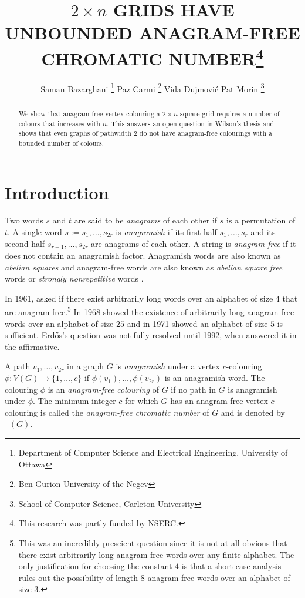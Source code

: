 \documentclass{patmorin}
\title{\MakeUppercase{$2\times n$ Grids have Unbounded Anagram-Free Chromatic Number}\thanks{This research was partly funded by NSERC.}}
\author{Saman Bazarghani%
    \thanks{Department of Computer Science and Electrical Engineering, University of Ottawa}\qquad
    Paz Carmi%
    \thanks{Ben-Gurion University of the Negev}\qquad
    Vida Dujmović\footnotemark[2]\qquad
    Pat Morin%
    \thanks{School of Computer Science, Carleton University}}
\date{}
\DeclareMathOperator{\afcn}{\dot{\chi}_\pi}
\begin{document}
\maketitle

\begin{abstract}
    We show that anagram-free vertex colouring a $2\times n$ square grid requires a number of colours that increases with $n$.  This answers an open question in Wilson's thesis and shows that even graphs of pathwidth $2$ do not have anagram-free colourings with a bounded number of colours.
\end{abstract}

%



\section{Introduction}

Two words $s$ and $t$ are said to be \emph{anagrams} of each other if $s$ is a permutation of $t$.  A single word $s:=s_1,\ldots,s_{2r}$ is \emph{anagramish} if its first half $s_1,\ldots,s_r$ and its second half $s_{r+1},\ldots,s_{2r}$ are anagrams of each other.  A string is \emph{anagram-free} if it does not contain an anagramish factor.  Anagramish words are also known as \emph{abelian squares} and anagram-free words are also known as \emph{abelian square free} words or \emph{strongly nonrepetitive} words \cite{X,Y,Z}.

In 1961, \citet{erdos:some} asked if there exist arbitrarily long words over an alphabet of size $4$ that are anagram-free.\footnote{This was an incredibly prescient question since it is not at all obvious that there exist arbitrarily long anagram-free words over any finite alphabet. The only justification for choosing the constant $4$ is that a short case analysis rules out the possibility of length-$8$ anagram-free words over an alphabet of size $3$.}  In 1968 \citet{evdokimov:strongly,evdokimov:strongly2} showed the existence of arbitrarily long anagram-free words over an alphabet of size $25$ and in 1971 \citet{pleasants:non-repetitive} showed an alphabet of size $5$ is sufficient.  Erd\H{o}s's question was not fully resolved until 1992, when \citet{keranen:abelian} answered it in the affirmative.

A path $v_1,\ldots,v_{2r}$ in a graph $G$ is \emph{anagramish} under a vertex $c$-colouring $\phi:V(G)\to\{1,\ldots,c\}$ if $\phi(v_1),\ldots,\phi(v_{2r})$ is an anagramish word.  The colouring $\phi$ is an \emph{anagram-free colouring} of $G$ if no path in $G$ is anagramish under $\phi$.  The minimum integer $c$ for which $G$ has an anagram-free vertex $c$-colouring is called the \emph{anagram-free chromatic number} of $G$ and is denoted by $\afcn(G)$.
\end{document}
